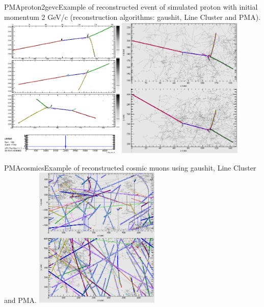 \begin{cdrfigure}{PMAproton2gevc}{Example of reconstructed event of simulated proton with initial momentum 2 GeV/c (reconstruction algorithms: gaushit, Line Cluster and PMA).}
\includegraphics[width=0.45\textwidth]{figures/evdtwqproj117703.png}
\includegraphics[width=0.45\textwidth]{figures/evdlarortho3d117703.png}
\end{cdrfigure}
\begin{cdrfigure}{PMAcosmics}{Example of reconstructed cosmic muons using gaushit, Line Cluster and PMA.}
\includegraphics[width=0.45\textwidth]{figures/evdlarortho3d11302.png}
\end{cdrfigure}



